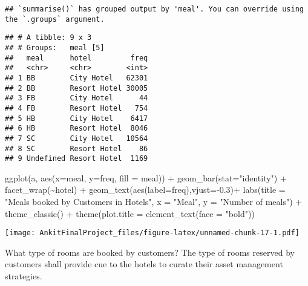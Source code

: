 \documentclass[
]{article}
\newenvironment{Shaded}{\begin{snugshade}}{\end{snugshade}}
\newcommand{\AttributeTok}[1]{\textcolor[rgb]{0.77,0.63,0.00}{#1}}
\newcommand{\FloatTok}[1]{\textcolor[rgb]{0.00,0.00,0.81}{#1}}
\newcommand{\FunctionTok}[1]{\textcolor[rgb]{0.00,0.00,0.00}{#1}}
\newcommand{\NormalTok}[1]{#1}
\newcommand{\SpecialCharTok}[1]{\textcolor[rgb]{0.00,0.00,0.00}{#1}}
\newcommand{\StringTok}[1]{\textcolor[rgb]{0.31,0.60,0.02}{#1}}
\begin{document}
\begin{verbatim}
## `summarise()` has grouped output by 'meal'. You can override using the `.groups` argument.
\end{verbatim}

\begin{verbatim}
## # A tibble: 9 x 3
## # Groups:   meal [5]
##   meal      hotel         freq
##   <chr>     <chr>        <int>
## 1 BB        City Hotel   62301
## 2 BB        Resort Hotel 30005
## 3 FB        City Hotel      44
## 4 FB        Resort Hotel   754
## 5 HB        City Hotel    6417
## 6 HB        Resort Hotel  8046
## 7 SC        City Hotel   10564
## 8 SC        Resort Hotel    86
## 9 Undefined Resort Hotel  1169
\end{verbatim}

\begin{Shaded}
\begin{Highlighting}[]
\FunctionTok{ggplot}\NormalTok{(a, }\FunctionTok{aes}\NormalTok{(}\AttributeTok{x=}\NormalTok{meal, }\AttributeTok{y=}\NormalTok{freq, }\AttributeTok{fill =}\NormalTok{ meal)) }\SpecialCharTok{+}
 \FunctionTok{geom\_bar}\NormalTok{(}\AttributeTok{stat=}\StringTok{"identity"}\NormalTok{) }\SpecialCharTok{+} \FunctionTok{facet\_wrap}\NormalTok{(}\SpecialCharTok{\textasciitilde{}}\NormalTok{hotel) }\SpecialCharTok{+}
\FunctionTok{geom\_text}\NormalTok{(}\FunctionTok{aes}\NormalTok{(}\AttributeTok{label=}\NormalTok{freq),}\AttributeTok{vjust=}\SpecialCharTok{{-}}\FloatTok{0.3}\NormalTok{)}\SpecialCharTok{+}
  \FunctionTok{labs}\NormalTok{(}\AttributeTok{title =} \StringTok{"Meals booked by Customers in Hotels"}\NormalTok{, }\AttributeTok{x =} \StringTok{"Meal"}\NormalTok{, }\AttributeTok{y =} \StringTok{"Number of meals"}\NormalTok{) }\SpecialCharTok{+}
 \FunctionTok{theme\_classic}\NormalTok{() }\SpecialCharTok{+}
 \FunctionTok{theme}\NormalTok{(}\AttributeTok{plot.title =} \FunctionTok{element\_text}\NormalTok{(}\AttributeTok{face =} \StringTok{"bold"}\NormalTok{))}
\end{Highlighting}
\end{Shaded}

\texttt{[image: AnkitFinalProject\_files/figure-latex/unnamed-chunk-17-1.pdf]}

What type of rooms are booked by customers? The type of rooms reserved
by customers shall provide cue to the hotels to curate their asset
management strategies.
\end{document}
